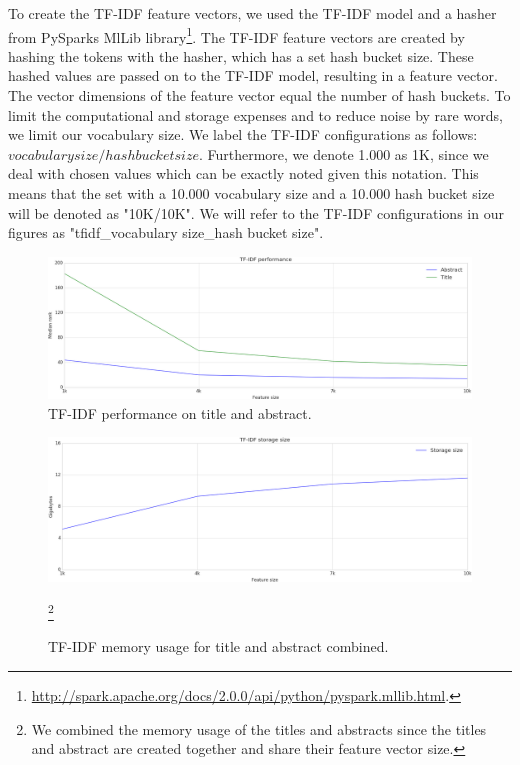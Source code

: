 \documentclass[../../Thesis.tex]{subfiles}
\begin{document}
\clearpage
{}
To create the TF-IDF feature vectors, we used the TF-IDF model and a hasher from PySparks MlLib library\footnote{\url{http://spark.apache.org/docs/2.0.0/api/python/pyspark.mllib.html}.}. The TF-IDF feature vectors are created by hashing the tokens with the hasher, which has a set hash bucket size. These hashed values are passed on to the TF-IDF model, resulting in a feature vector. The vector dimensions of the feature vector equal the number of hash buckets. To limit the computational and storage expenses and to reduce noise by rare words, we limit our vocabulary size.
We label the TF-IDF configurations as follows: $vocabulary size/hash bucket size$. Furthermore, we denote 1.000 as 1K, since we deal with chosen values which can be exactly noted given this notation. This means that the set with a 10.000 vocabulary size and a 10.000 hash bucket size will be denoted as "10K/10K". We will refer to the TF-IDF configurations in our figures as "tfidf\_vocabulary size\_hash bucket size".
\begin{figure}[hbt]
\includegraphics[width=5in]{Plots/tfidf_selection_plot_performance}
\caption{TF-IDF performance on title and abstract.}\label{figure:tfidfPerformance}
\end{figure}
\begin{figure}[hbt]
\includegraphics[width=5in]{Plots/tfidf_selection_plot_memory}
\caption{TF-IDF memory usage for title and abstract combined.}\footnote{We combined the memory usage of the titles and abstracts since the titles and abstract are created together and share their feature vector size.}\label{figure:tfidfMemory}
\end{figure}
\end{document}

